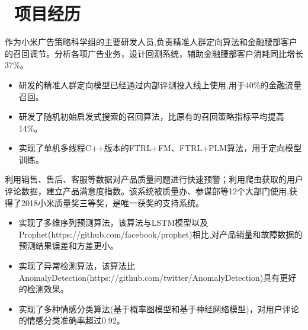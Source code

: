 \documentclass{resume}
\begin{document}

\section{\faUsers\ 项目经历}

\begin{onehalfspacing}
  作为小米广告策略科学组的主要研发人员,负责精准人群定向算法和金融腰部客户的召回调节。分析各项广告业务，设计回测系统，辅助金融腰部客户消耗同比增长37\%。
\begin{itemize}
  \item 研发的精准人群定向模型已经通过内部评测投入线上使用,用于40\%的金融流量召回。
  \item 研发了随机初始启发式搜索的召回算法，比原有的召回策略指标平均提高14\%。
  \item 实现了单机多线程C++版本的FTRL+FM、FTRL+PLM算法，用于定向模型训练。
\end{itemize}
\end{onehalfspacing}


\begin{onehalfspacing}
利用销售、售后、客服等数据对产品质量问题进行快速预警；利用爬虫获取的用户评论数据，建立产品满意度指数。该系统被质量办、参谋部等12个大部门使用,获得了2018小米质量奖三等奖，是唯一获奖的支持系统。
\begin{itemize}
  \item 实现了多维序列预测算法，该算法与LSTM模型以及Prophet(https://github.com/facebook/prophet)相比,对产品销量和故障数据的预测结果误差和方差更小。
  \item 实现了异常检测算法，该算法比AnomalyDetection(https://github.com/twitter/AnomalyDetection)具有更好的检测效果。
  \item 实现了多种情感分类算法(基于概率图模型和基于神经网络模型)，对用户评论的情感分类准确率超过0.92。
\end{itemize}
\end{onehalfspacing}
\end{document}
